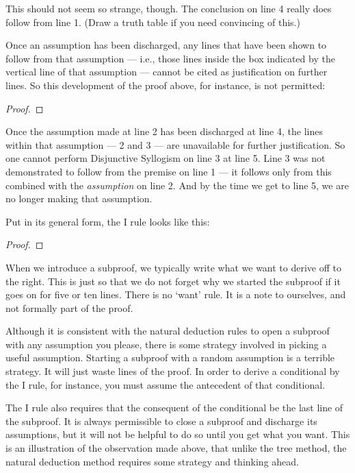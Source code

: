 This should not seem so strange, though. The conclusion on line 4 really does follow from line 1. (Draw a truth table if you need convincing of this.) 

Once an assumption has been discharged, any lines that have been shown to follow from that assumption --- i.e., those lines inside the box indicated by the vertical line of that assumption --- cannot be cited as justification on further lines. So this development of the proof above, for instance, is not permitted:

\begin{proof}
	\open
	\close
\end{proof}

Once the assumption made at line 2 has been discharged at line 4, the lines within that assumption --- 2 and 3 --- are unavailable for further justification. So one cannot perform Disjunctive Syllogism  on line 3 at line 5. Line 3 was not demonstrated to follow from the premise on line 1 --- it follows only from this combined with the \emph{assumption} on line 2. And by the time we get to line 5, we are no longer making that assumption.

Put in its general form, the {\eif}I rule looks like this:

\begin{proof}
	\open
		\metaA{} 
		\metaB{}
	\close
\end{proof}

When we introduce a subproof, we typically write what we want to derive off to the right. This is just so that we do not forget why we started the subproof if it goes on for five or ten lines. There is no `want' rule. It is a note to ourselves, and not formally part of the proof.

Although it is consistent with the natural deduction rules to open a subproof with any assumption you please, there is some strategy involved in picking a useful assumption. Starting a subproof with a random assumption is a terrible strategy. It will just waste lines of the proof. In order to derive a conditional by the {\eif}I rule, for instance, you must assume the antecedent of that conditional.

The {\eif}I rule also requires that the consequent of the conditional be the last line of the subproof. It is always permissible to close a subproof and discharge its assumptions, but it will not be helpful to do so until you get what you want. This is an illustration of the observation made above, that unlike the tree method, the natural deduction method requires some strategy and thinking ahead.

